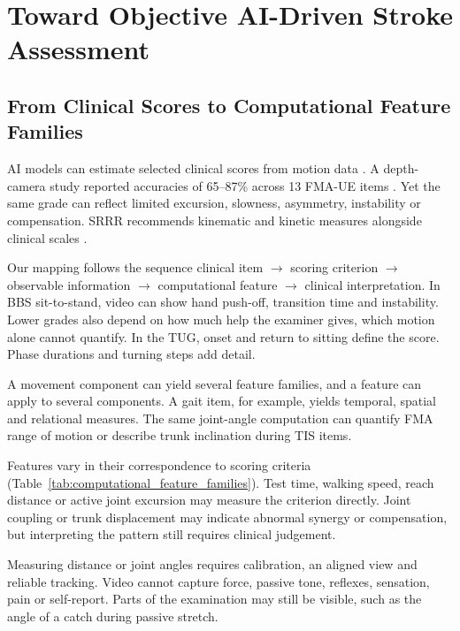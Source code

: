 \documentclass[11pt]{article}
\begin{document}

\clearpage

\section{Toward Objective AI-Driven Stroke Assessment}
\label{sec:framework}
\subsection{From Clinical Scores to Computational Feature Families}

AI models can estimate selected clinical scores from motion data \cite{Lee2021SmartphoneVideoAmbulation,Formstone2021IMUMMG,Zamin2023BIONICS,Li2017IMUEMGMotorEvaluation}. A depth-camera study reported accuracies of 65--87\% across 13 FMA-UE items \cite{Kim2016KinectFMA}. Yet the same grade can reflect limited excursion, slowness, asymmetry, instability or compensation. SRRR recommends kinematic and kinetic measures alongside clinical scales \cite{CoreKwakkel2019SRRRUpperLimb,CoreVanCriekinge2024SRRRBalanceMobility}.

Our mapping follows the sequence clinical item $\rightarrow$ scoring criterion $\rightarrow$ observable information $\rightarrow$ computational feature $\rightarrow$ clinical interpretation. In BBS sit-to-stand, video can show hand push-off, transition time and instability. Lower grades also depend on how much help the examiner gives, which motion alone cannot quantify. In the TUG, onset and return to sitting define the score. Phase durations and turning steps add detail.

A movement component can yield several feature families, and a feature can apply to several components. A gait item, for example, yields temporal, spatial and relational measures. The same joint-angle computation can quantify FMA range of motion or describe trunk inclination during TIS items.

Features vary in their correspondence to scoring criteria (Table~\ref{tab:computational_feature_families}). Test time, walking speed, reach distance or active joint excursion may measure the criterion directly. Joint coupling or trunk displacement may indicate abnormal synergy or compensation, but interpreting the pattern still requires clinical judgement.

Measuring distance or joint angles requires calibration, an aligned view and reliable tracking. Video cannot capture force, passive tone, reflexes, sensation, pain or self-report. Parts of the examination may still be visible, such as the angle of a catch during passive stretch.
\end{document}
